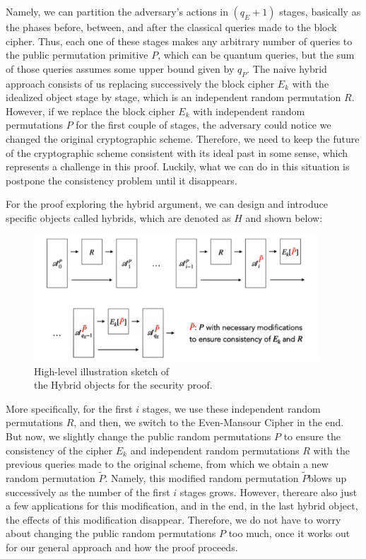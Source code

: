 \documentclass[12pt]{article}
\begin{document}
    \noindent Namely, we can partition the adversary's actions in $({q}_{E} + 1)$ stages, basically as the phases before, between, and after the classical queries made to the block cipher. Thus, each one of these stages makes any arbitrary number of queries to the public permutation primitive $P$, which can be quantum queries, but the sum of those queries assumes some upper bound given by ${q}_{P}$. The naive hybrid approach consists of us replacing successively the block cipher ${E}_{k}$ with the idealized object stage by stage, which is an independent random permutation $R$. However, if we replace the block cipher ${E}_{k}$ with independent random permutations $P$ for the first couple of stages, the adversary could notice we changed the original cryptographic scheme. Therefore, we need to keep the future of the cryptographic scheme consistent with its ideal past in some sense, which represents a challenge in this proof. Luckily, what we can do in this situation is postpone the consistency problem until it disappears.

    \clearpage
    
    \noindent For the proof exploring the hybrid argument, we can design and introduce specific objects called hybrids, which are denoted as $H$ and shown below:

    \begin{figure}[ht]
        \captionsetup{justification=centering}
        \centering
        
        \includegraphics[width=0.95\textwidth]{figures/images/img-6.pdf}
        \caption{High-level illustration sketch of\\ the Hybrid objects for the security proof.}
    \end{figure}
    

    \noindent More specifically, for the first $i$ stages, we use these independent random permutations $R$, and then, we switch to the Even-Mansour Cipher in the end. But now, we slightly change the public random permutations $P$ to ensure the consistency of the cipher ${E}_{k}$ and independent random permutations $R$ with the previous queries made to the original scheme, from which we obtain a new random permutation $\tilde{P}$. Namely, this modified random permutation $\tilde{P}$\break blows up successively as the number of the first $i$ stages grows. However, there\break are also just a few applications for this modification, and in the end, in the last hybrid object, the effects of this modification disappear. Therefore, we do not have to worry about changing the public random permutations $P$ too much, once it works out for our general approach and how the proof proceeds.
\end{document}
